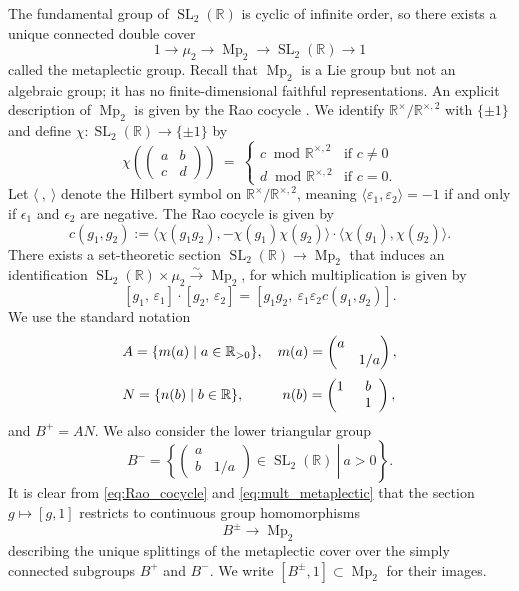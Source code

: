 \documentclass[reqno, 11pt]{amsart} %
\numberwithin{equation}{section}
\theoremstyle{plain}
\theoremstyle{definition}
\theoremstyle{remark}
\newcommand{\lr}{\longrightarrow}
\newcommand{\mbR}{\mathbb{R}}
\newcommand{\simto}{\overset{\sim}{\to}}
\DeclareMathOperator{\SL}{SL}
\DeclareMathOperator{\Mp}{Mp}
\begin{document}
The fundamental group of $\SL_2(\mbR)$ is cyclic of infinite order, so there exists a unique connected double cover
\begin{equation}\label{eq:metaplictic_cover}
1\lr μ_2 \lr \Mp_2 \lr \SL_2(\mbR)\lr 1
\end{equation}
called the metaplectic group. Recall that $\Mp_2$ is a Lie group but not an algebraic group; it has no finite-dimensional faithful representations. An explicit description of $\Mp_2$ is given by the Rao cocycle \cite[p. 363]{Kudla_splitting}. We identify $\mbR^\times/\mbR^{\times,2}$ with $\{\pm 1\}$ and define $χ:\SL_2(\mbR)\lr \{\pm 1\}$ by
$$χ\left(\begin{pmatrix}
a & b \\ c & d
\end{pmatrix}\right)\ =\ \begin{cases} \text{$c\ $ mod $\mbR^{\times,2}$} & \text{if $c\neq 0$}\\
\text{$d\ $ mod $\mbR^{\times, 2}$} & \text{if $c = 0$.}
\end{cases}$$
Let $\langle\ ,\ \rangle$ denote the Hilbert symbol on $\mbR^\times/\mbR^{\times,2}$, meaning $\langle ε_1, ε_2\rangle = -1$ if and only if  $\epsilon_1$ and $\epsilon_2$ are negative. The Rao cocycle is given by
\begin{equation}\label{eq:Rao_cocycle}
c(g_1, g_2) := \langle χ(g_1g_2), -χ(g_1)χ(g_2)\rangle\cdot \langle χ(g_1), χ(g_2)\rangle.
\end{equation}
There exists a set-theoretic section $\SL_2(\mbR) \to \Mp_2$ that induces an identification $\SL_2(\mbR)\times μ_2\simto \Mp_2$, for which multiplication is given by
\begin{equation}\label{eq:mult_metaplectic}
[g_1,\, ε_1]\cdot [g_2,\, ε_2] = [g_1g_2, \ ε_1ε_2c(g_1,g_2)].
\end{equation}
We use the standard notation
$$\begin{aligned}
& A = \{m(a) \mid a\in \mbR_{>0}\}, \quad m(a) = \begin{pmatrix}
a & \\ & 1/a
\end{pmatrix},\\[1mm]
& N = \{n(b) \mid b\in \mbR\}, \mkern 31mu \quad n(b) = \begin{pmatrix}
1 & b \\ & \mkern 9mu 1 \mkern 9mu
\end{pmatrix},
\end{aligned}$$
and  $B^+ = AN$. We  also consider the lower triangular group
$$B^- = \left.\left\{\begin{pmatrix}a & \\ b & 1/a\end{pmatrix} \in \SL_2(\mbR)\ \right \vert\ a > 0\right\}.$$
It is clear from \eqref{eq:Rao_cocycle} and \eqref{eq:mult_metaplectic} that the section $g\mapsto [g,1]$ restricts to continuous group homomorphisms
$$B^{\pm}\lr \Mp_2$$
describing the unique splittings of the metaplectic cover over the simply connected subgroups $B^+$ and $B^-$. We write $[B^\pm, 1] \subset \Mp_2$ for their images.
\end{document}
